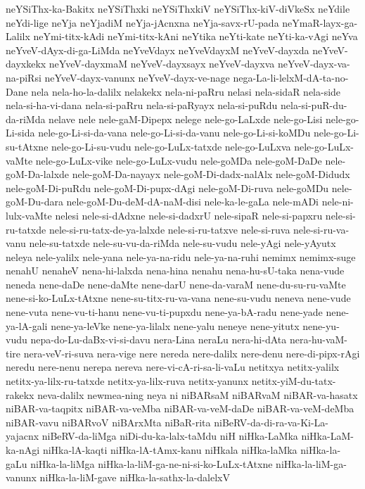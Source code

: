 {neYSiThx-ka-Bakitx
neYSiThxki
neYSiThxkiV
neYSiThx-kiV-diVkeSx
neYdile
neYdi-lige
neYja
neYjadiM
neYja-jAcnxna
neYja-savx-rU-pada
neYmaR-layx-ga-Lalilx
neYmi-titx-kAdi
neYmi-titx-kAni
neYtika
neYti-kate
neYti-ka-vAgi
neYva
neYveV-dAyx-di-ga-LiMda
neYveVdayx
neYveVdayxM
neYveV-dayxda
neYveV-dayxkekx
neYveV-dayxmaM
neYveV-dayxsayx
neYveV-dayxva
neYveV-dayx-va-na-piRsi
neYveV-dayx-vanunx
neYveV-dayx-ve-nage
nega-La-li-lelxM-dA-ta-no-Dane
nela
nela-ho-la-dalilx
nelakekx
nela-ni-paRru
nelasi
nela-sidaR
nela-side
nela-si-ha-vi-dana
nela-si-paRru
nela-si-paRyayx
nela-si-puRdu
nela-si-puR-du-da-riMda
nelave
nele
nele-gaM-Dipepx
nelege
nele-go-LaLxde
nele-go-Lisi
nele-go-Li-sida
nele-go-Li-si-da-vana
nele-go-Li-si-da-vanu
nele-go-Li-si-koMDu
nele-go-Li-su-tAtxne
nele-go-Li-su-vudu
nele-go-LuLx-tatxde
nele-go-LuLxva
nele-go-LuLx-vaMte
nele-go-LuLx-vike
nele-go-LuLx-vudu
nele-goMDa
nele-goM-DaDe
nele-goM-Da-lalxde
nele-goM-Da-nayayx
nele-goM-Di-dadx-nalAlx
nele-goM-Didudx
nele-goM-Di-puRdu
nele-goM-Di-pupx-dAgi
nele-goM-Di-ruva
nele-goMDu
nele-goM-Du-dara
nele-goM-Du-deM-dA-naM-disi
nele-ka-le-gaLa
nele-mADi
nele-ni-lulx-vaMte
nelesi
nele-si-dAdxne
nele-si-dadxrU
nele-sipaR
nele-si-papxru
nele-si-ru-tatxde
nele-si-ru-tatx-de-ya-lalxde
nele-si-ru-tatxve
nele-si-ruva
nele-si-ru-va-vanu
nele-su-tatxde
nele-su-vu-da-riMda
nele-su-vudu
nele-yAgi
nele-yAyutx
neleya
nele-yalilx
nele-yana
nele-ya-na-ridu
nele-ya-na-ruhi
nemimx
nemimx-suge
nenahU
nenaheV
nena-hi-lalxda
nena-hina
nenahu
nena-hu-sU-taka
nena-vude
neneda
nene-daDe
nene-daMte
nene-darU
nene-da-varaM
nene-du-su-ru-vaMte
nene-si-ko-LuLx-tAtxne
nene-su-titx-ru-va-vana
nene-su-vudu
neneva
nene-vude
nene-vuta
nene-vu-ti-hanu
nene-vu-ti-pupxdu
nene-ya-bA-radu
nene-yade
nene-ya-lA-gali
nene-ya-leVke
nene-ya-lilalx
nene-yalu
neneye
nene-yitutx
nene-yu-vudu
nepa-do-Lu-daBx-vi-si-davu
nera-Lina
neraLu
nera-hi-dAta
nera-hu-vaM-tire
nera-veV-ri-suva
nera-vige
nere
nereda
nere-dalilx
nere-denu
nere-di-pipx-rAgi
neredu
nere-nenu
nerepa
nereva
nere-vi-cA-ri-sa-li-vaLu
netitxya
netitx-yalilx
netitx-ya-lilx-ru-tatxde
netitx-ya-lilx-ruva
netitx-yanunx
netitx-yiM-du-tatx-rakekx
neva-dalilx
newmea-ning
neya
ni
niBARsaM
niBARvaM
niBAR-va-hasatx
niBAR-va-taqpitx
niBAR-va-veMba
niBAR-va-veM-daDe
niBAR-va-veM-deMba
niBAR-vavu
niBARvoV
niBArxMta
niBaR-rita
niBeRV-da-di-ra-va-Ki-La-yajacnx
niBeRV-da-liMga
niDi-du-ka-lalx-taMdu
niH
niHka-LaMka
niHka-LaM-ka-nAgi
niHka-lA-kaqti
niHka-lA-tAmx-kanu
niHkala
niHka-laMka
niHka-la-gaLu
niHka-la-liMga
niHka-la-liM-ga-ne-ni-si-ko-LuLx-tAtxne
niHka-la-liM-ga-vanunx
niHka-la-liM-gave
niHka-la-sathx-la-dalelxV
}
